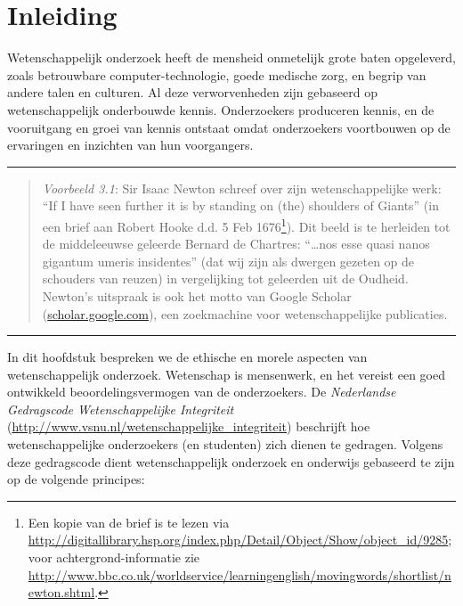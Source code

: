\documentclass[
]{book}
\begin{document}
\hypertarget{sec:integriteit-inleiding}{%
\section{Inleiding}\label{sec:integriteit-inleiding}}

Wetenschappelijk onderzoek heeft de mensheid onmetelijk grote baten
opgeleverd, zoals betrouwbare computer-technologie, goede medische zorg,
en begrip van andere talen en culturen. Al deze verworvenheden zijn
gebaseerd op wetenschappelijk onderbouwde kennis. Onderzoekers
produceren kennis, en de vooruitgang en groei van kennis ontstaat omdat
onderzoekers voortbouwen op de ervaringen en inzichten van hun
voorgangers.

\begin{center}\rule{0.5\linewidth}{0.5pt}\end{center}

\begin{quote}
\emph{Voorbeeld 3.1}: Sir Isaac Newton schreef over zijn
wetenschappelijke werk: ``If I have seen further it is by standing on (the)
shoulders of Giants'' (in een brief aan Robert Hooke d.d. 5 Feb
1676\footnote{Een kopie van de brief is te lezen via \url{http://digitallibrary.hsp.org/index.php/Detail/Object/Show/object_id/9285}; voor achtergrond-informatie zie \url{http://www.bbc.co.uk/worldservice/learningenglish/movingwords/shortlist/newton.shtml}.}). Dit beeld is te herleiden tot de middeleeuwse geleerde
Bernard de Chartres: ``\ldots nos esse quasi nanos gigantum umeris
insidentes'' (dat wij zijn als dwergen gezeten op de schouders van
reuzen) in vergelijking tot geleerden uit de Oudheid. Newton's
uitspraak is ook het motto van Google Scholar
(\url{scholar.google.com}), een zoekmachine voor
wetenschappelijke publicaties.
\end{quote}

\begin{center}\rule{0.5\linewidth}{0.5pt}\end{center}

In dit hoofdstuk bespreken we de ethische en morele aspecten van
wetenschappelijk onderzoek. Wetenschap is mensenwerk, en het vereist een
goed ontwikkeld beoordelingsvermogen van de onderzoekers. De
\emph{Nederlandse Gedragscode Wetenschappelijke Integriteit} \citep{VSNU18}
(\url{http://www.vsnu.nl/wetenschappelijke_integriteit}) beschrijft hoe
wetenschappelijke onderzoekers (en studenten) zich dienen te gedragen.
Volgens deze gedragscode dient wetenschappelijk onderzoek en onderwijs
gebaseerd te zijn op de volgende principes:
\end{document}
